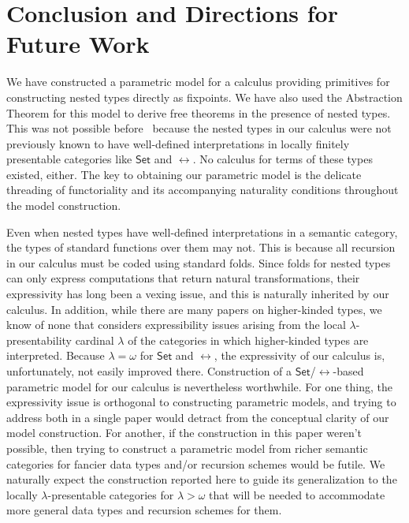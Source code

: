 \documentclass{lmcs}
\theoremstyle{plain}\newtheorem{satz}[thm]{Satz}
\newcommand{\set}{\mathsf{Set}}
\begin{document}
\section{Conclusion and Directions for Future Work}\label{sec:conclusion}

We have constructed a parametric model for a calculus
providing primitives for constructing nested types directly as
fixpoints.
We have also used the Abstraction Theorem for this model to derive
free theorems in the presence of nested types. This was not possible
before~\cite{jp19} because the nested types in our calculus were not
previously known to have well-defined interpretations in locally
finitely presentable categories like $\set$ and $\rel$. No calculus
for terms of these types existed, either. The key to obtaining our
parametric model is
the delicate threading of functoriality and its accompanying
naturality conditions throughout the model construction.

Even when nested types have well-defined interpretations in a semantic
category, the types of standard functions over them may not. This is
because all recursion in our calculus must be coded using standard
folds.  Since folds for nested types can only express computations
that return natural transformations, their expressivity has long been
a vexing issue, and this is naturally inherited by our calculus.
In addition, while there are many papers on higher-kinded types, we
know of none that considers expressibility issues arising from the
local $\lambda$-presentability cardinal $\lambda$ of the categories in
which higher-kinded types are interpreted. Because $\lambda = \omega$
for $\set$ and $\rel$, the expressivity of our
calculus is, unfortunately, not easily improved there. Construction of
a $\set$/$\rel$-based parametric model for our calculus is
nevertheless worthwhile.  For one thing, the expressivity issue is
orthogonal to constructing parametric models,
and trying to address both in a single paper would
detract from the conceptual clarity of our model construction.
%
For another, if the construction in this paper
weren't possible, then trying to construct a parametric model from
richer semantic categories for fancier data types and/or recursion
schemes would be futile. We naturally expect the construction reported
here to guide its generalization to the locally $\lambda$-presentable
categories for $\lambda > \omega$ that will be needed to accommodate
more general data types and recursion schemes for them.
\end{document}
